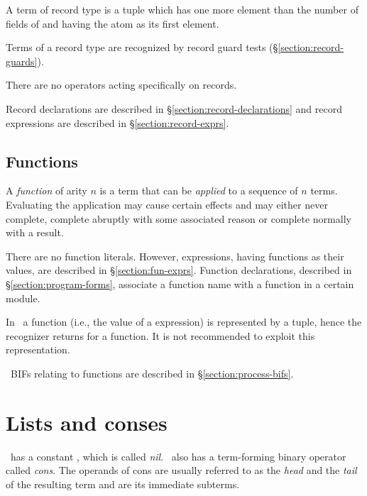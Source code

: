 A term of record type  is a tuple which has one more element than the
number of fields of  and having the atom  as its first element.

Terms of a record type  are recognized by record guard tests
(\S\ref{section:record-guards}).

There are no operators acting specifically on records.

Record declarations are described in
\S\ref{section:record-declarations} and record expressions are
described in \S\ref{section:record-exprs}.

\ifOld
\subsection{Functions}

\label{section:functions}

A \emph{function} of arity $n$ is a term that can be \emph{applied}
to a sequence of $n$ terms.  Evaluating the application may cause
certain effects and may either never complete, complete abruptly
with some associated reason or complete normally with a result.

There are no function literals.  However,  expressions, having
functions as their values, are described in
\S\ref{section:fun-exprs}.  Function declarations, described in
\S\ref{section:program-forms}, associate a function name with a
function in a certain module.

In \OldErlang\ a function (i.e., the value of a  expression)
is represented by a tuple, hence
the recognizer  returns  for a function.
It is not recommended to exploit this representation. 

\Erlang\ BIFs relating to functions are described in \S\ref{section:process-bifs}.
\fi
{}

\section{Lists and conses}

\label{section:lists}

\Erlang\ has a constant \T{[]}, which is called \emph{nil}.
\Erlang\ also has a term-forming binary operator \T{[$\cdots$|$\cdots$]}
called \emph{cons}.  The operands of cons are usually referred
to as the \emph{head} and the \emph{tail} of the resulting term and
are its immediate subterms.

